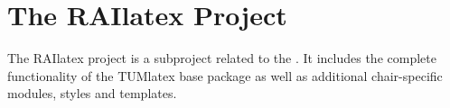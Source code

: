 \section{The RAIlatex Project}%
\label{sec:Introduction_RAIlatexProject}%
The RAIlatex project is a subproject related to the \RAIlangChair. It includes the complete functionality of the TUMlatex base package as well as additional chair-specific modules, styles and templates.\par%
%
%
